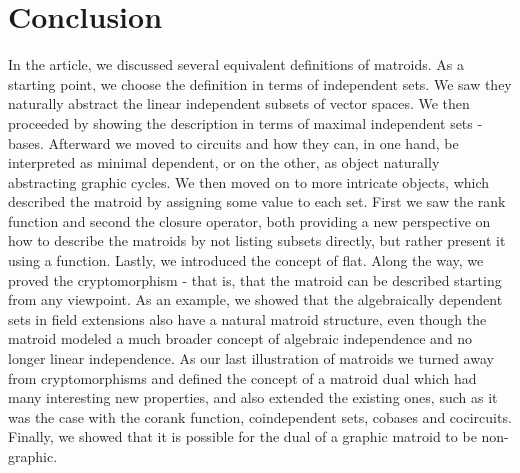 \newpage
\section{Conclusion}
In the article, we discussed several equivalent definitions of matroids. As a starting point, we choose the definition in terms of independent sets. We saw they naturally abstract the linear independent subsets of vector spaces. We then proceeded by showing the description in terms of maximal independent sets - bases. Afterward we moved to circuits and how they can, in one hand, be interpreted as minimal dependent, or on the other, as object naturally abstracting graphic cycles. We then moved on to more intricate objects, which described the matroid by assigning some value to each set. First we saw the rank function and second the closure operator, both providing a new perspective on how to describe the matroids by not listing subsets directly, but rather present it using a function. Lastly, we introduced the concept of flat. Along the way, we proved the cryptomorphism - that is, that the matroid can be described starting from any viewpoint. As an example, we showed that the algebraically dependent sets in field extensions also have a natural matroid structure, even though the matroid modeled a much broader concept of algebraic independence and no longer linear independence. As our last illustration of matroids we turned away from cryptomorphisms and defined the concept of a matroid dual which had many interesting new properties, and also extended the existing ones, such as it was the case with the corank function, coindependent sets, cobases and cocircuits. Finally, we showed that it is possible for the dual of a graphic matroid to be non-graphic.
